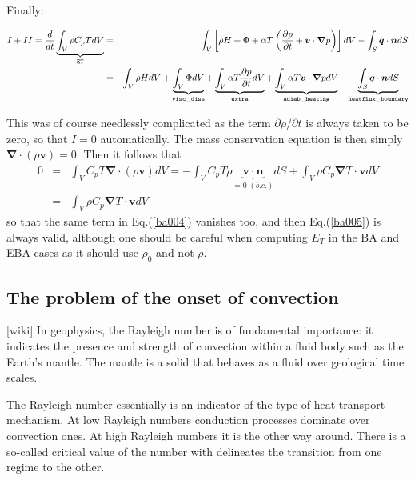 Finally:

\begin{eqnarray}
I+II=\frac{d}{dt} \underbrace{\int_V \rho C_p T dV }_{\tt ET}
 &=& 
 \int_V \left[ 
 \rho H  + \Phi    +\alpha T \left( \frac{\partial p}{\partial t}+  \bm v \cdot {\bm \nabla} p \right) \right]  dV 
- \int_S  {\bm q} \cdot {\bm n}  dS \\ 
 &=& 
 \int_V \rho H dV 
+\underbrace{\int_V \Phi  dV}_{\tt visc\_diss}  
+\underbrace{\int_V \alpha T \frac{\partial p}{\partial t} dV}_{\tt extra}
+\underbrace{\int_V \alpha T \bm v \cdot {\bm \nabla} p  dV}_{\tt adiab\_heating} 
- \underbrace{\int_S  {\bm q} \cdot {\bm n}  dS}_{\tt heatflux\_boundary} \label{ba005}
\end{eqnarray}

This was of course needlessly complicated as the term $\partial \rho/\partial t$ is always 
taken to be zero, so that $I=0$ automatically. The mass conservation equation is then 
simply ${\bm \nabla}\cdot (\rho {\bm v})=0$. Then it follows that 
\begin{eqnarray}
0&=& \int_V C_p T {\bm \nabla} \cdot (\rho {\bm v}) dV
=
-\int_V C_p T \rho \underbrace{{\bm v} \cdot {\bm n}}_{=0 \; (b.c.)} dS +  \int_V \rho C_p  {\bm \nabla}  T \cdot {\bm v} dV \\
&=&  \int_V \rho C_p  {\bm \nabla}  T \cdot {\bm v} dV 
\end{eqnarray}
so that the same term in Eq.(\ref{ba004}) vanishes too, and then Eq.(\ref{ba005}) is always valid, although one should be careful when computing $E_T$ in the BA and EBA cases as it should use $\rho_0$ and not $\rho$.


\subsection*{The problem of the onset of convection}

[wiki] In geophysics, the Rayleigh number is of fundamental importance: it indicates the presence and strength of convection within a fluid body such as the Earth's mantle. The mantle is a solid that behaves as a fluid over geological time scales.

 The Rayleigh number essentially is an indicator of the type of heat transport mechanism. At low Rayleigh numbers conduction processes dominate over convection ones. At high Rayleigh numbers it is the other way around. There is a so-called critical value of the number with delineates the transition from one regime to the other. 

